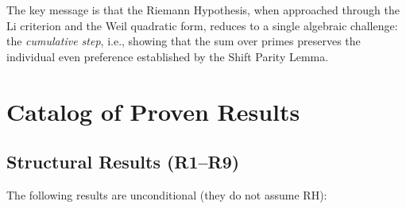 \documentclass[12pt,a4paper]{article}
\theoremstyle{definition}
\theoremstyle{remark}
\begin{document}
The key message is that the Riemann Hypothesis, when approached through the Li criterion and the Weil quadratic form, reduces to a single algebraic challenge: the \emph{cumulative step}, i.e., showing that the sum over primes preserves the individual even preference established by the Shift Parity Lemma.


\section{Catalog of Proven Results}
\label{sec:catalog}

\subsection{Structural Results (R1--R9)}

The following results are unconditional (they do not assume RH):
\end{document}
